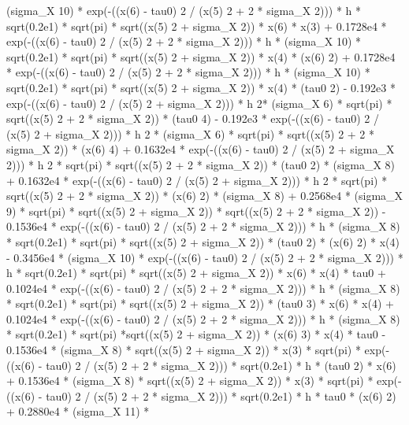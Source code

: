 \begin{maplegroup}
(sigma\_X  10) * exp(-((x(6) - tau0)  2 / (x(5) 2 + 2 * sigma\_X  2))) * h * sqrt(0.2e1) * sqrt(pi) * sqrt((x(5)  2 + sigma\_X  2)) * x(6) * x(3) + 0.1728e4 * exp(-((x(6) - tau0)  2 / (x(5)  2 + 2 * sigma\_X  2))) * h * (sigma\_X  10) * sqrt(0.2e1) * sqrt(pi) * sqrt((x(5)  2 + sigma\_X  2)) * x(4) * (x(6)  2) + 0.1728e4 * exp(-((x(6) - tau0)  2 / (x(5)  2 + 2 * sigma\_X  2))) * h * (sigma\_X  10) * sqrt(0.2e1) * sqrt(pi) * sqrt((x(5)  2 + sigma\_X  2)) * x(4) * (tau0  2) - 0.192e3 * exp(-((x(6) - tau0)  2 / (x(5)  2 + sigma\_X  2))) * h  2* (sigma\_X  6) * sqrt(pi) * sqrt((x(5)  2 + 2 * sigma\_X  2)) * (tau0  4) - 0.192e3 * exp(-((x(6) - tau0)  2 / (x(5)  2 + sigma\_X  2))) * h  2 * (sigma\_X  6) * sqrt(pi) * sqrt((x(5)  2 + 2 * sigma\_X  2)) * (x(6)  4) + 0.1632e4 * exp(-((x(6) - tau0)  2 / (x(5)  2 + sigma\_X  2))) * h  2 * sqrt(pi) * sqrt((x(5)  2 + 2 * sigma\_X  2)) * (tau0  2) * (sigma\_X  8) + 0.1632e4 * exp(-((x(6) - tau0)  2 / (x(5)  2 + sigma\_X  2))) * h  2 * sqrt(pi) * sqrt((x(5)  2 + 2 * sigma\_X  2)) * (x(6)  2) * (sigma\_X  8) + 0.2568e4 * (sigma\_X  9) * sqrt(pi) * sqrt((x(5)  2 + sigma\_X  2)) * sqrt((x(5)  2 + 2 * sigma\_X  2)) - 0.1536e4 * exp(-((x(6) - tau0)  2 / (x(5)  2 + 2 * sigma\_X  2))) * h * (sigma\_X  8) * sqrt(0.2e1) * sqrt(pi) * sqrt((x(5) 2 + sigma\_X  2)) * (tau0  2) * (x(6)  2) * x(4) - 0.3456e4 * (sigma\_X  10) * exp(-((x(6) - tau0)  2 / (x(5)  2 + 2 * sigma\_X  2))) * h * sqrt(0.2e1) * sqrt(pi) * sqrt((x(5)  2 + sigma\_X  2)) * x(6) * x(4) * tau0 + 0.1024e4 * exp(-((x(6) - tau0) 2 / (x(5)  2 + 2 * sigma\_X  2))) * h * (sigma\_X  8) * sqrt(0.2e1) * sqrt(pi) * sqrt((x(5)  2 + sigma\_X  2)) * (tau0  3) * x(6) * x(4) + 0.1024e4 * exp(-((x(6) - tau0)  2 / (x(5)  2 + 2 * sigma\_X  2))) * h * (sigma\_X  8) * sqrt(0.2e1) * sqrt(pi) *sqrt((x(5)  2 + sigma\_X  2)) * (x(6)  3) * x(4) * tau0 - 0.1536e4 * (sigma\_X  8) * sqrt((x(5)  2 + sigma\_X  2)) * x(3) * sqrt(pi) * exp(-((x(6) - tau0)  2 / (x(5)  2 + 2 * sigma\_X  2))) * sqrt(0.2e1) * h * (tau0  2) * x(6) + 0.1536e4 * (sigma\_X 8) * sqrt((x(5)  2 + sigma\_X  2)) * x(3) * sqrt(pi) * exp(-((x(6) - tau0)  2 / (x(5)  2 + 2 * sigma\_X  2))) * sqrt(0.2e1) * h * tau0 * (x(6)  2) + 0.2880e4 * (sigma\_X  11) * 
\end{maplegroup}
